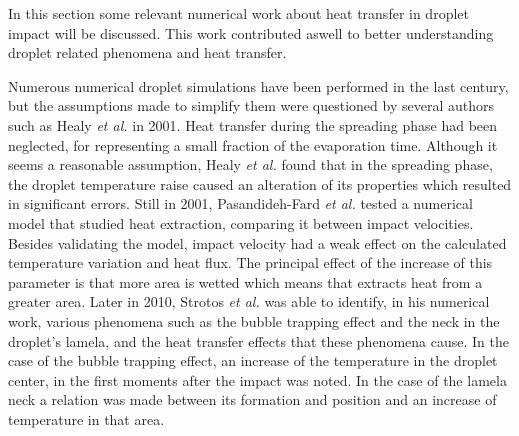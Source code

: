 \par In this section some relevant numerical work about heat transfer in droplet impact will be discussed. This work contributed aswell to better understanding droplet related phenomena and heat transfer.\\
\par Numerous numerical droplet simulations have been performed in the last century, but the assumptions made to simplify them were questioned by several authors such as Healy \textit{et al.} \cite{healy2001validity} in 2001. Heat transfer during the spreading phase had been neglected, for representing a small fraction of the evaporation time. Although it seems a reasonable assumption, Healy \textit{et al.} found that in the spreading phase, the droplet temperature raise caused an alteration of its properties which resulted in significant errors. Still in 2001, Pasandideh-Fard \textit{et al.} \cite{pasandideh2001cooling} tested a numerical model that studied heat extraction, comparing it between impact velocities. Besides validating the model, impact velocity had a weak effect on the calculated temperature variation and heat flux. The principal effect of the increase of this parameter is that more area is wetted which means that extracts heat from a greater area. Later in 2010, Strotos \textit{et al.} \cite{strotos2011non} was able to identify, in his numerical work, various phenomena such as the bubble trapping effect and the neck in the droplet's lamela, and the heat transfer effects that these phenomena cause. In the case of the bubble trapping effect, an increase of the temperature in the droplet center, in the first moments after the impact was noted. In the case of the lamela neck a relation was made between its formation and position and an increase of temperature in that area.


